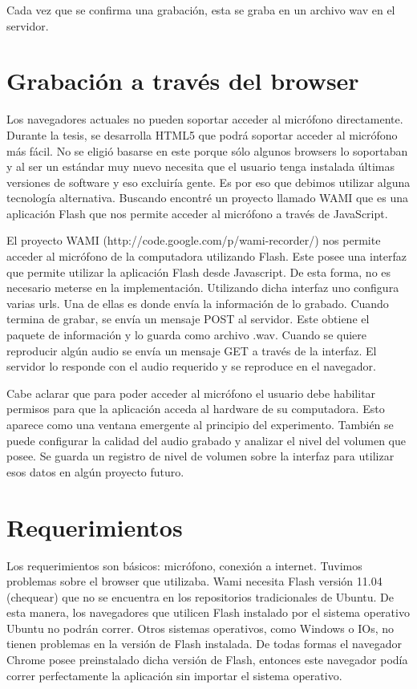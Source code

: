\documentclass[11pt,a4paper,twoside]{tesis}
\begin{document}
Cada vez que se confirma una grabación, esta se graba en un archivo wav en el servidor. 


\section{Grabación a través del browser}

Los navegadores actuales no pueden soportar acceder al micrófono directamente. Durante la tesis, se desarrolla HTML5 que podrá soportar acceder al micrófono más fácil. No se eligió basarse en este porque sólo algunos browsers lo soportaban y al ser un estándar muy nuevo necesita que el usuario tenga instalada últimas versiones de software y eso excluiría gente. Es por eso que debimos utilizar alguna tecnología alternativa. Buscando encontré un proyecto llamado WAMI que es una aplicación Flash que nos permite acceder al micrófono a través de JavaScript. 

El proyecto WAMI (http://code.google.com/p/wami-recorder/) nos permite acceder al micrófono de la computadora utilizando Flash. Este posee una interfaz que permite utilizar la aplicación Flash desde Javascript. De esta forma, no es necesario meterse en la implementación. Utilizando dicha interfaz uno configura varias urls. Una de ellas es donde envía la información de lo grabado. Cuando termina de grabar, se envía un mensaje POST al servidor. Este obtiene el paquete de información y lo guarda como archivo .wav. Cuando se quiere reproducir algún audio se envía un mensaje GET a través de la interfaz. El servidor lo responde con el audio requerido y se reproduce en el navegador. 

Cabe aclarar que para poder acceder al micrófono el usuario debe habilitar permisos para que la aplicación acceda al hardware de su computadora. Esto aparece como una ventana emergente al principio del experimento. También se puede configurar la calidad del audio grabado y analizar el nivel del volumen que posee. Se guarda un registro de nivel de volumen sobre la interfaz para utilizar esos datos en algún proyecto futuro.

\section{Requerimientos}

Los requerimientos son básicos: micrófono, conexión a internet. 
Tuvimos problemas sobre el browser que utilizaba. Wami necesita Flash versión 11.04 (chequear) que no se encuentra en los repositorios tradicionales de Ubuntu. De esta manera, los navegadores que utilicen Flash instalado por el sistema operativo Ubuntu no podrán correr. Otros sistemas operativos, como Windows o IOs, no tienen problemas en la versión de Flash instalada. De todas formas el navegador Chrome posee preinstalado dicha versión de Flash, entonces este navegador podía correr perfectamente la aplicación sin importar el sistema operativo.
\end{document}

